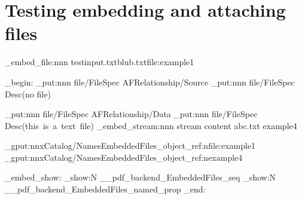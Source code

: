 \documentclass{article}
\begin{document}
\section{Testing embedding and attaching files}
\ExplSyntaxOn
\pdffile_embed_file:nnn {testinput.txt}{blub.txt}{file:example1}



\group_begin:
\pdfdict_put:nnn  {file/FileSpec} {AFRelationship}{/Source}
\pdfdict_put:nnn  {file/FileSpec} {Desc}{(no file)}

\pdfdict_put:nnn  {file/FileSpec} {AFRelationship}{/Data}
\pdfdict_put:nnn  {file/FileSpec} {Desc}{(this~is~a~text~file)}
\pdffile_embed_stream:nnn {stream content} {abc.txt} {example4}



\pdfcoredict_gput:nnx{Catalog/Names}{EmbeddedFiles}{\pdf_object_ref:n{file:example1}}
\pdfcoredict_gput:nnx{Catalog/Names}{EmbeddedFiles}{\pdf_object_ref:n{example4}}

\pdffile_embed_show:
\seq_show:N  \g__pdf_backend_EmbeddedFiles_seq
\prop_show:N \g__pdf_backend_EmbeddedFiles_named_prop
\group_end:
\end{document}
